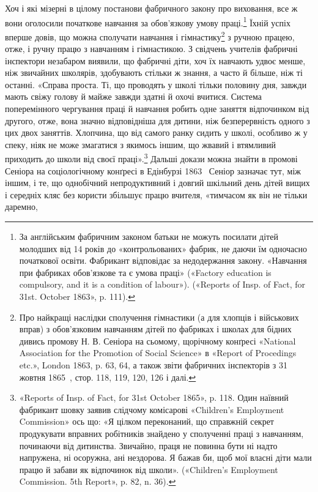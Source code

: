 Хоч і які мізерні в цілому постанови фабричного закону про
виховання, все ж вони оголосили початкове навчання за обов’язкову
умову праці.\footnote{
За англійським фабричним законом батьки не можуть посилати
дітей молодших від 14 років до «контрольованих» фабрик, не даючи
їм одночасно початкової освіти. Фабрикант відповідає за недодержання
закону. «Навчання при фабриках обов'язкове та є умова праці» («Factory
education is compulsory, and it is a condition of labour»). («Reports of
Insp. of Fact, for 31st. October 1863», p. 111).
} Їхній успіх вперше довів, що можна сполучати
навчання і гімнастику\footnote{
Про найкращі наслідки сполучення гімнастики (а для хлопців
і військових вправ) з обов’язковим навчанням дітей по фабриках і школах
для бідних дивись промову Н. В. Сеніора на сьомому, щорічному конґресі
«National Association for the Promotion of Social Science» в «Report
of Procedings etc.», London 1863, p. 63, 64, а також звіти фабричних інспекторів
з 31 жовтня 1865~, стор. 118, 119, 120, 126 і далі.
} з ручною працею, отже, і ручну
працю з навчанням і гімнастикою. З свідчень учителів фабричні
інспектори незабаром виявили, що фабричні діти, хоч їх навчають
удвоє менше, ніж звичайних школярів, здобувають стільки ж
знання, а часто й більше, ніж ті останні. «Справа проста. Ті, що
проводять у школі тільки половину дня, завжди мають свіжу
голову й майже завжди здатні й охочі вчитися. Система поперемінного
чергування праці й навчання робить одне заняття відпочинком
від другого, отже, вона значно відповідніша для дитини,
ніж безперервність одного з цих двох заняттів. Хлопчина, що від
самого ранку сидить у школі, особливо ж у спеку, ніяк не може
змагатися з якимось іншим, що жвавий і втямливий приходить до
школи від своєї праці».\footnote{
«Reports of Insp. of Fact, for 31st October 1865», p. 118. Один
наївний фабрикант шовку заявив слідчому комісарові «Children’s Employment
Commission» ось що: «Я цілком переконаний, що справжній секрет
продукувати вправних робітників знайдено у сполученні праці з навчанням,
починаючи від дитинства. Звичайно, праця не повинна бути ні
надто напружена, ні осоружна, ані нездорова. Я бажав би, щоб мої
власні діти мали працю й забави як відпочинок від школи». («Children’s
Employment Commission. 5th Report», p. 82, n. 36).
} Дальші докази можна знайти в промові
Сеніора на соціологічному конґресі в Едінбурзі 1863~ Сеніор
зазначає тут, між іншим, і те, що однобічний непродуктивний і
довгий шкільний день дітей вищих і середніх кляс без користи
збільшує працю вчителя, «тимчасом як він не тільки даремно,
